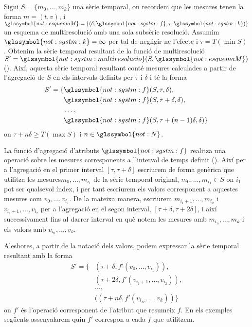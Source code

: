 \begin{definition}
  \label{def:informacio:notaciovalors}
  Sigui $S=\{m_0,\dotsc,m_k\}$ una sèrie temporal, on recordem que les
  mesures tenen la forma $m=(t,v)$, i $\glssymbol{not:esquemaM}= \{
  (\delta, \glssymbol{not:sgstm:f} , \tau, \glssymbol{not:sgstm:k})
  \}$ un esquema de multiresolució amb una sola subsèrie
  resolució. Assumim $ \glssymbol{not:sgstm:k}=\infty$ per tal de
  negligir-ne l'efecte i $\tau=T(\min S)$. Obtenim la sèrie temporal
  resultant de la funció de multiresolució
  $S'=\glssymbol{not:sgstm:multiresolucio}(S,\glssymbol{not:esquemaM})$
  ().  Així, aquesta sèrie temporal
  resultant conté mesures calculades a partir de l'agregació de $S$ en
  els intervals definits per $\tau$ i $\delta$ i té la forma
  \begin{align*}
    S'=  \{ & \glssymbol{not:sgstm:f}(S,\tau,\delta), \\
    & \glssymbol{not:sgstm:f}(S,\tau+\delta,\delta),\\
    &\dotsc, \\
    & \glssymbol{not:sgstm:f}(S,\tau+(n-1)\delta,\delta)\}
  \end{align*}
  on $\tau+n\delta\geq T(\max S)$ i $n\in\glssymbol{not:N}$.


  La funció d'agregació d'atributs $\glssymbol{not:sgstm:f}$ realitza
  una operació sobre les mesures corresponents a l'interval de temps
  definit ().  Així per a l'agregació en
  el primer interval $[\tau,\tau+\delta]$ escriurem de forma genèrica
  que utilitza les mesures$m_0,\dotsc,m_{i_1}$ de la sèrie temporal
  original, $m_0,\dotsc,m_{i_1} \in S$ on $i_1$ pot ser qualsevol
  índex, i per tant escriurem els valors corresponent a aquestes
  mesures com $v_0,\dotsc,v_{i_1}$. De la mateixa manera, escriurem
  $m_{i_1+1},\dotsc,m_{i_2}$ i $v_{i_1+1},\dotsc,v_{i_2}$ per a
  l'agregació en el segon interval,
  $[\tau+\delta,\tau+2\delta]$, i així successivament
  fins al darrer interval en què notem les mesures amb $m_{i_n},
  \dotsc, m_k$ i els valors amb $v_{i_n}, \dotsc, v_k$.

  Aleshores, a partir de la notació dels valors, podem expressar la
  sèrie temporal resultant amb la forma
  \begin{align*}
    S'=\{& (\tau+\delta, f'(v_0,\dotsc,v_{i_1})),\\
    & (\tau+2\delta, f'(v_{i_1+1},\dotsc,v_{i_2})),\\
    & \dotsc,\\
    & ((\tau+n\delta ,f'(v_{i_M},\dotsc, v_k)) \}
  \end{align*}
  on $f'$ és l'operació corresponent de l'atribut que resumeix
  $f$. En els exemples següents assenyalarem quin $f'$ correspon a
  cada $f$ que utilitzem.
\end{definition}
